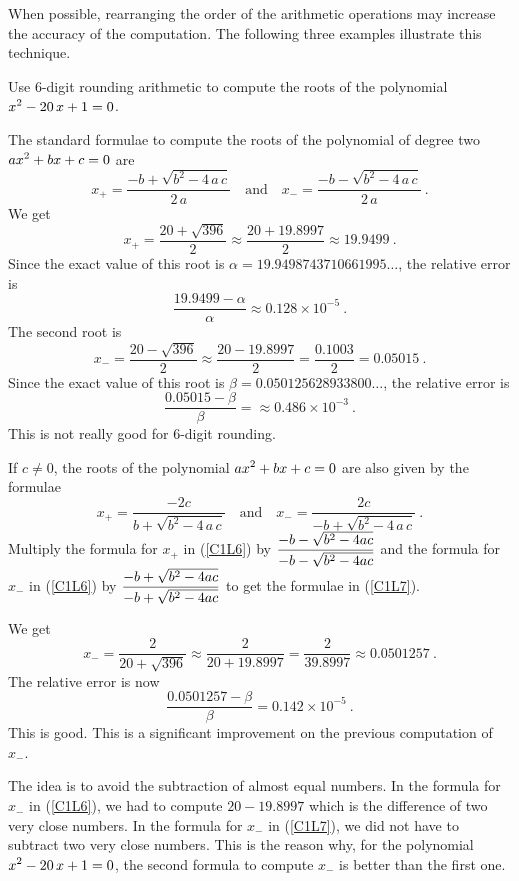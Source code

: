 When possible, rearranging the order of the arithmetic operations may
increase the accuracy of the computation.  The following three examples
illustrate this technique.

\begin{egg}
Use $6$-digit rounding arithmetic to compute the roots of the
polynomial $\displaystyle x^2-20\,x+1=0$.

The standard formulae to compute the
roots of the polynomial of degree two $\displaystyle a x^2+b x+c=0$ are
\begin{equation}
x_{+} =\frac{-b+\sqrt{b^2-4\,a\,c}}{2\,a}
\quad \text{and} \quad
x_{-} =\frac{-b-\sqrt{b^2-4\,a\,c}}{2\,a}  \ . \label{C1L6}
\end{equation}
We get
\[
x_{+}=\frac{20+\sqrt{396}}{2} \approx \frac{20+19.8997}{2}
\approx 19.9499 \ .
\]
Since the exact value of this root is
$\alpha = 19.9498743710661995\ldots$, the relative error is
\[
\frac{19.9499 - \alpha}{\alpha} \approx 0.128 \times 10^{-5} \ .
\]
The second root is
\[
x_{-}=\frac{20-\sqrt{396}}{2} \approx
\frac{20-19.8997}{2} = \frac{0.1003}{2} = 0.05015 \ .
\]
Since the exact value of this root is $\beta =
0.050125628933800\ldots$, the relative error is
\[
\frac{0.05015 - \beta}{\beta} =\approx 0.486 \times 10^{-3} \ .
\]
This is not really good for $6$-digit rounding.

If $c\neq 0$, the roots of the polynomial
$\displaystyle a x^2+b x+c=0$ are also
given by the formulae
\begin{equation}
x_{+} = \frac{-2c}{b+\sqrt{b^2-4\,a\,c}} \quad \text{and} \quad
x_{-} = \frac{2c}{-b+\sqrt{b^2-4\,a\,c}} \ .  \label{C1L7}
\end{equation}
Multiply the formula for $x_{+}$ in (\ref{C1L6}) by
$\displaystyle \frac{-b-\sqrt{b^2-4ac}}{-b-\sqrt{b^2-4ac}}$ and the
formula for $x_{-}$ in (\ref{C1L6}) by
$\displaystyle \frac{-b+\sqrt{b^2-4ac}}{-b+\sqrt{b^2-4ac}}$ to get the
formulae in (\ref{C1L7}).

We get
\[
x_{-} = \frac{2}{20+\sqrt{396}} \approx \frac{2}{20+19.8997}
= \frac{2}{39.8997} \approx 0.0501257 \ .
\]
The relative error is now
\[
\frac{0.0501257 - \beta}{\beta} = 0.142 \times 10^{-5} \ .
\]
This is good.  This is a significant improvement on the previous
computation of $x_{-}$.

The idea is to avoid the subtraction of almost equal numbers.  In
the formula for $x_{-}$ in (\ref{C1L6}), we had to
compute $20-19.8997$ which is the difference of two very close numbers.
In the formula for $x_{-}$ in (\ref{C1L7}), we did not have to
subtract two very close numbers.  This is the reason why, for the polynomial
$\displaystyle x^2-20\,x+1=0$, the second formula to compute $x_-$ is
better than the first one.
\end{egg}

